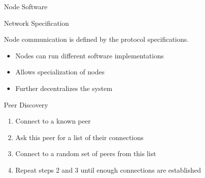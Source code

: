 \documentclass[]{beamer}
\begin{document}
\begin{frame}{Node Software}
	\centering
	\begin{tikzpicture}[scale=0.7, every node/.style={scale=1}]
		
	\end{tikzpicture}
\end{frame}

\begin{frame}{Network Specification}
	\begin{center}
		\begin{tikzpicture}[scale=0.7, every node/.style={scale=1}]
			
		\end{tikzpicture}
	\end{center}
	\vspace{.5 cm}
	
	Node communication is defined by the \color{focus}protocol specifications\color{black}.
	\begin{itemize}
		\item<2-> Nodes can run different software implementations
		\item<3-> Allows specialization of nodes
		\item<3-> \color{focus}Further decentralizes \color{black}the system
	\end{itemize}
\end{frame}

\begin{frame}{Peer Discovery}
	\begin{center}
		\begin{tikzpicture}[scale=1, every node/.style={scale=1}]
			
		\end{tikzpicture}
	\end{center}
	\begin{enumerate}
		\item<2-> Connect to a known peer
		\item<3-> Ask this peer for a list of their connections
		\item<4-> Connect to a random set of peers from this list
		\item<5-> Repeat steps 2 and 3 until enough connections are established
	\end{enumerate}
\end{frame}
\end{document}
